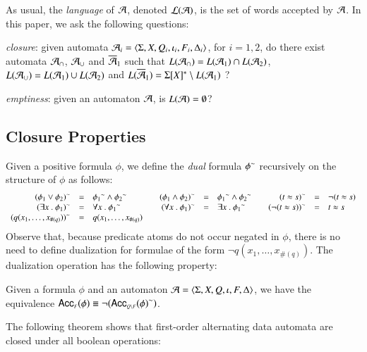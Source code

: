 \documentclass{llncs}
\begin{document}
As usual, the \emph{language} of $\mathcal{A}$, denoted ${\mathcal L}({\mathcal{A}})$, is the set
of words accepted by $\mathcal{A}$. In this paper, we ask the following
questions: \begin{compactenum}
\item \emph{closure}: given automata $\mathcal{A}_i =
  \langle \Sigma,X,Q_i,\iota_i,F_i,\Delta_i \rangle$, for $i=1,2$, do there
  exist automata $\mathcal{A}_\cap$, $\mathcal{A}_\cup$ and $\overline{\mathcal{A}}_1$ such that
  $L(\mathcal{A}_\cap) = L(\mathcal{A}_1) \cap L(\mathcal{A}_2)$, $L(\mathcal{A}_\cup) = L(\mathcal{A}_1) \cup
  L(\mathcal{A}_2)$ and $L(\overline{\mathcal{A}}_1) = \Sigma[X]^* \setminus L(\mathcal{A}_1)$ ?
%
\item \emph{emptiness}: given an automaton $\mathcal{A}$, is $L(\mathcal{A}) =
  \emptyset$?
\end{compactenum}

\subsection{Closure Properties}

Given a positive formula $\phi$, we define the \emph{dual} formula
${\phi}^{\sim}$ recursively on the structure of $\phi$ as follows: 
\[\begin{array}{rclcrclcrcl}
{(\phi_1 \vee \phi_2)}^{\sim} & = & {\phi_1}^{\sim} \wedge {\phi_2}^{\sim} && 
{(\phi_1 \wedge \phi_2)}^{\sim} & = & {\phi_1}^{\sim} \wedge {\phi_2}^{\sim} &&
{(t \approx s)}^{\sim} & = & \neg(t \approx s) \\
{(\exists x ~.~ \phi_1)}^{\sim} & = & \forall x ~.~ {\phi_1}^{\sim} && 
{(\forall x ~.~ \phi_1)}^{\sim} & = & \exists x ~.~ {\phi_1}^{\sim} && 
{(\neg(t \approx s))}^{\sim} & = & t \approx s \\
{(q(x_1,\ldots,x_{\#(q)}))}^{\sim} & = & q(x_1,\ldots,x_{\#(q)})
\end{array}\]
Observe that, because predicate atoms do not occur negated in $\phi$,
there is no need to define dualization for formulae of the form $\neg
q(x_1,\ldots,x_{\#(q)})$. The dualization operation has the following
property:
\begin{lemma}\label{lemma:dual}
  Given a formula $\phi$ and an automaton
  $\mathcal{A}=\langle \Sigma,X,Q,\iota,F,\Delta \rangle$, we have the equivalence
  $\mathsf{Acc}_{\scriptscriptstyle{F}}({\phi}) \equiv \neg({\mathsf{Acc}_{\scriptscriptstyle{Q\setminus F}}({\phi})}^{\sim})$. 
\end{lemma}

The following theorem shows that first-order alternating data automata
are closed under all boolean operations: 
\end{document}
